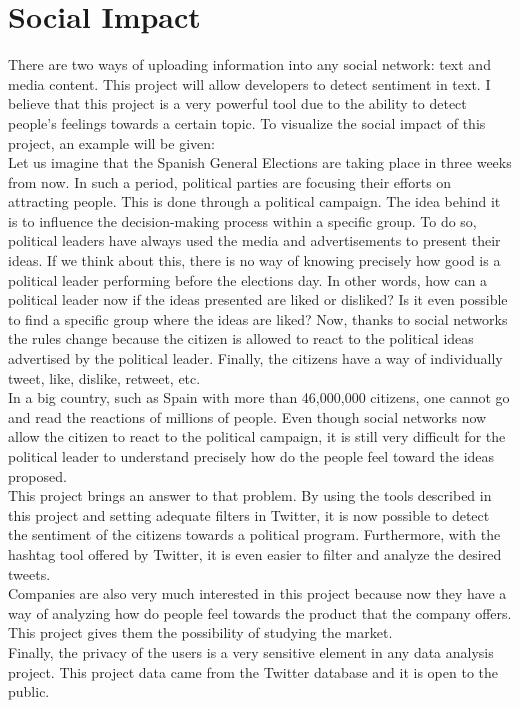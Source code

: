 \section{Social Impact}
There are two ways of uploading information into any social network: text and media content. This project will allow developers to detect sentiment in text. I believe that this project is a very powerful tool due to the ability to detect people's feelings towards a certain topic. To visualize the social impact of this project, an example will be given:\\
Let us imagine that the Spanish General Elections are taking place in three weeks from now. In such a period, political parties are focusing their efforts on attracting people. This is done through a political campaign. The idea behind it is to influence the decision-making process within a specific group. To do so, political leaders have always used the media and advertisements to present their ideas. If we think about this, there is no way of knowing precisely how good is a political leader performing before the elections day. In other words, how can a political leader now if the ideas presented are liked or disliked? Is it even possible to find a specific group where the ideas are liked?  Now, thanks to social networks the rules change because the citizen is allowed to react to the political ideas advertised by the political leader. Finally, the citizens have a way of individually tweet, like, dislike, retweet, etc.\\
In a big country, such as Spain with more than 46,000,000 citizens, one cannot go and read the reactions of millions of people. Even though social networks now allow the citizen to react to the political campaign, it is still very difficult for the political leader to understand precisely how do the people feel toward the ideas proposed.\\
This project brings an answer to that problem. By using the tools described in this project and setting adequate filters in Twitter, it is now possible to detect the sentiment of the citizens towards a political program. Furthermore, with the hashtag tool offered by Twitter, it is even easier to filter and analyze the desired tweets.\\
Companies are also very much interested in this project because now they have a way of analyzing how do people feel towards the product that the company offers. This project gives them the possibility of studying the market.\\
Finally, the privacy of the users is a very sensitive element in any data analysis project. This project data came from the Twitter database and it is open to the public.
